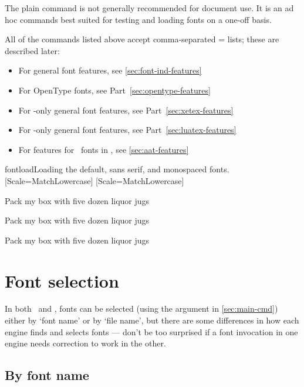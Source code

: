 \documentclass[a4paper]{l3doc}
\begin{document}
\bigskip
{}

The plain  command is not generally recommended for document use. It is an
ad hoc commands best suited for testing and loading fonts on a one-off basis.

All of the commands listed above accept comma-separated
= lists; these are described later:
\begin{itemize}[nosep]
\item For general font features, see \vref{sec:font-ind-features}
\item For OpenType fonts, see Part~\vref{sec:opentype-features}
\item For \XeTeX-only general font features, see Part~\vref{sec:xetex-features}
\item For \LuaTeX-only general font features, see Part~\vref{sec:luatex-features}
\item For features for \AAT\ fonts in \XeTeX, see \vref{sec:aat-features}
\end{itemize}

\begin{Lexample}{fontload}{Loading the default, sans serif, and monospaced fonts.}
  \setmainfont{texgyrebonum-regular.otf}
  \setsansfont{lmsans10-regular.otf}[Scale=MatchLowercase]
  \setmonofont{Inconsolatazi4-Regular.otf}[Scale=MatchLowercase]

  \rmfamily Pack my box with five dozen liquor jugs\par
  \sffamily Pack my box with five dozen liquor jugs\par
  \ttfamily Pack my box with five dozen liquor jugs
\end{Lexample}

\section{Font selection}

In both \LuaTeX\ and \XeTeX, fonts can be selected (using the  argument in \ref{sec:main-cmd}) either by `font name' or by `file name', but there are some differences in how each engine finds and selects fonts --- don't be too surprised if a font invocation in one engine needs correction to work in the other.


\subsection{By font name}
\end{document}
